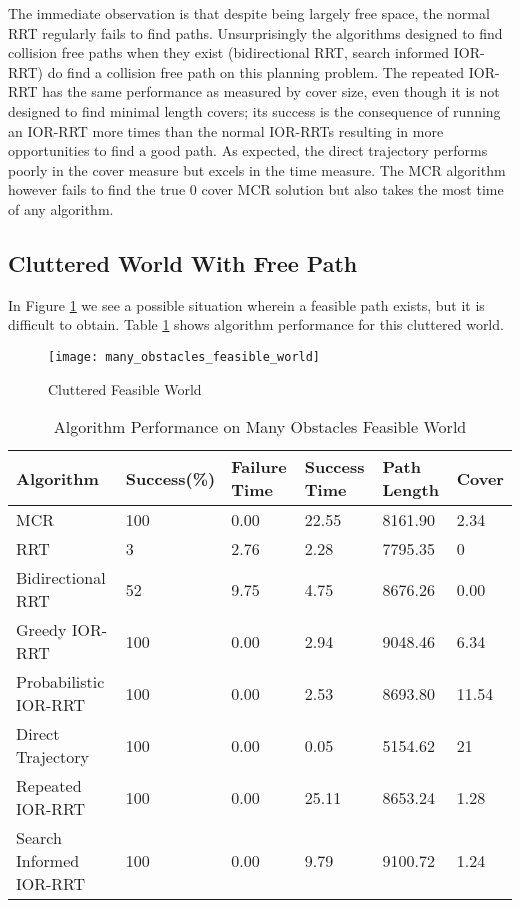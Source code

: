 The immediate observation is that despite being largely free space, the normal RRT regularly fails to find paths. Unsurprisingly the algorithms designed to find collision free paths when they exist (bidirectional RRT, search informed IOR-RRT) do find a collision free path on this planning problem. The repeated IOR-RRT has the same performance as measured by cover size, even though it is not designed to find minimal length covers; its success is the consequence of running an IOR-RRT more times than the normal IOR-RRTs resulting in more opportunities to find a good path. As expected, the direct trajectory performs poorly in the cover measure but excels in the time measure. The MCR algorithm however fails to find the true 0 cover MCR solution but also takes the most time of any algorithm.

\subsection{Cluttered World With Free Path}
In Figure \ref{fig:many_obstacles_feasible_world} we see a possible situation wherein a feasible path exists, but it is difficult to obtain. Table \ref{tab:many_obstacles_feasible_world} shows algorithm performance for this cluttered world.

\begin{figure}[h!]
    \centering
    \texttt{[image: many\_obstacles\_feasible\_world]}
    \caption{Cluttered Feasible World}
    \label{fig:many_obstacles_feasible_world}
\end{figure}


\begin{table}[h!]
\centering
\begin{tabular}{@{}llllll@{}}
\toprule
Algorithm & Success(\%)  & Failure Time  & Success Time  & Path Length & Cover\\ 
\midrule
MCR & 100 & 0.00 & 22.55 & 8161.90 & 2.34 \\
RRT & 3 & 2.76 & 2.28 & 7795.35 & 0 \\
Bidirectional RRT & 52 & 9.75 & 4.75 & 8676.26 & 0.00 \\
Greedy IOR-RRT & 100 & 0.00 & 2.94 & 9048.46 & 6.34 \\
Probabilistic IOR-RRT & 100 & 0.00 & 2.53 & 8693.80 & 11.54 \\
Direct Trajectory & 100 & 0.00 & 0.05 & 5154.62 & 21 \\
Repeated IOR-RRT & 100 & 0.00 & 25.11 & 8653.24 & 1.28 \\
Search Informed IOR-RRT & 100 & 0.00 & 9.79 & 9100.72 & 1.24 \\
\bottomrule
\end{tabular}
\caption{Algorithm Performance on Many Obstacles Feasible World}
\label{tab:many_obstacles_feasible_world}
\end{table}

